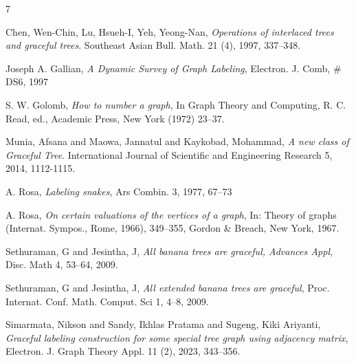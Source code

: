 \documentclass[10pt]{article}
\theoremstyle{definition}
\begin{document}


\begin{thebibliography}{7}

  Chen, Wen-Chin, Lu, Hsueh-I, Yeh, Yeong-Nan, \textit{Operations of interlaced trees and graceful trees}. Southeast Asian Bull. Math. 21 (4), 1997, 337--348.

  Joseph A. Gallian, \textit{A Dynamic Survey of Graph Labeling}, Electron. J. Comb, $\#$DS6, 1997

  S. W. Golomb, \textit{How to number a graph}, In Graph Theory and Computing, R. C.
  Read, ed., Academic Press, New York (1972) 23--37.

  Munia, Afsana and Maowa, Jannatul and Kaykobad, Mohammad, \textit{A new class of Graceful Tree}. International Journal of Scientific and Engineering Research 5, 2014, 1112-1115.

  A. Rosa, \textit{Labeling snakes}, Ars Combin. 3, 1977, 67--73

  A. Rosa, \textit{On certain valuations of the vertices of a graph}, In: Theory of graphs (Internat. Sympos., Rome, 1966), 349--355, Gordon \& Breach, New York, 1967.

  Sethuraman, G and Jesintha, J, \textit{All banana trees are graceful, Advances Appl}, Disc. Math 4, 53--64, 2009.

  Sethuraman, G and Jesintha, J, \textit{All extended banana trees are graceful}, Proc. Internat. Conf. Math. Comput. Sci 1, 4--8, 2009.

  Simarmata, Nikson and Sandy, Ikhlas Pratama and Sugeng, Kiki Ariyanti, \textit{Graceful labeling construction for some special tree graph using adjacency matrix}, Electron. J. Graph Theory Appl. 11 (2), 2023, 343--356.

\end{thebibliography}
\end{document}
